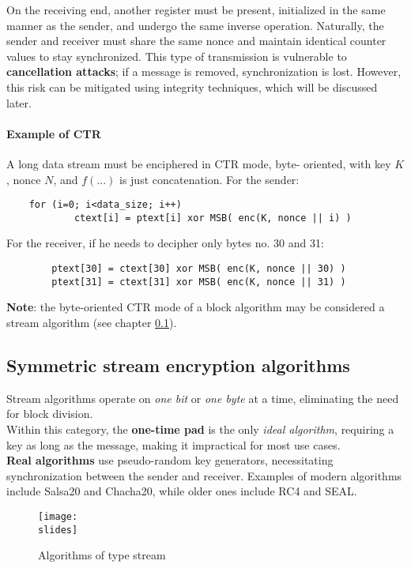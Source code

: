 On the receiving end, another register must be present, initialized in the same manner as the sender, and undergo the same inverse operation. Naturally, the sender and receiver must share the same nonce and maintain identical counter values to stay synchronized. This type of transmission is vulnerable to \textbf{cancellation attacks}; if a message is removed, synchronization is lost. However, this risk can be mitigated using integrity techniques, which will be discussed later.

\paragraph{Example of CTR}
A long data stream must be enciphered in CTR mode, byte-
oriented, with key $K$, nonce $N$, and $f(...)$ is just concatenation.
For the sender:
\begin{verbatim}
    for (i=0; i<data_size; i++)
            ctext[i] = ptext[i] xor MSB( enc(K, nonce || i) )
\end{verbatim}
For the receiver, if he needs to decipher only bytes no. 30 and 31:
\begin{verbatim}
        ptext[30] = ctext[30] xor MSB( enc(K, nonce || 30) )
        ptext[31] = ctext[31] xor MSB( enc(K, nonce || 31) )
\end{verbatim}

\textbf{Note}: the byte-oriented CTR mode of a block algorithm may be considered a stream algorithm (see chapter \ref{chap:symmetricstream}).

\newpage
\subsection{Symmetric stream encryption algorithms}\label{chap:symmetricstream}

Stream algorithms operate on \textit{one bit} or \textit{one byte} at a time, eliminating the need for block division. \\
Within this category, the \textbf{one-time pad} is the only \textit{ideal algorithm}, requiring a key as long as the message, making it impractical for most use cases.\\
\textbf{Real algorithms} use pseudo-random key generators, necessitating synchronization between the sender and receiver. Examples of modern algorithms include Salsa20 and Chacha20, while older ones include RC4 and SEAL.

\begin{figure}[h]
    \centering
    \texttt{[image: \\slides]}
    \caption{Algorithms of type stream}
\end{figure}

